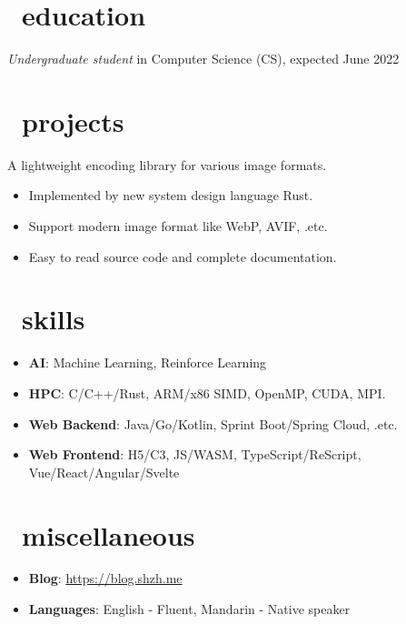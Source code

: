 \documentclass{common}
\begin{document}


\section{\faGraduationCap\ education}
\textit{Undergraduate student} in Computer Science (CS), expected June 2022

\section{\faCubes\ projects}
A lightweight encoding library for various image formats.
\begin{itemize}
  \item Implemented by new system design language Rust.
  \item Support modern image format like WebP, AVIF, .etc.
  \item Easy to read source code and complete documentation.
\end{itemize}

\section{\faCogs\ skills}
\begin{itemize}[parsep=0.5ex]
  \item \textbf{AI}: Machine Learning, Reinforce Learning
  \item \textbf{HPC}: C/C++/Rust, ARM/x86 SIMD, OpenMP, CUDA, MPI.
  \item \textbf{Web Backend}: Java/Go/Kotlin, Sprint Boot/Spring Cloud, .etc.
  \item \textbf{Web Frontend}: H5/C3, JS/WASM, TypeScript/ReScript, Vue/React/Angular/Svelte
\end{itemize}

\section{\faInfo\ miscellaneous}
\begin{itemize}[parsep=0.5ex]
  \item \textbf{Blog}: \href{https://blog.shzh.me}{https://blog.shzh.me}
  \item \textbf{Languages}: English - Fluent, Mandarin - Native speaker
\end{itemize}
\end{document}
